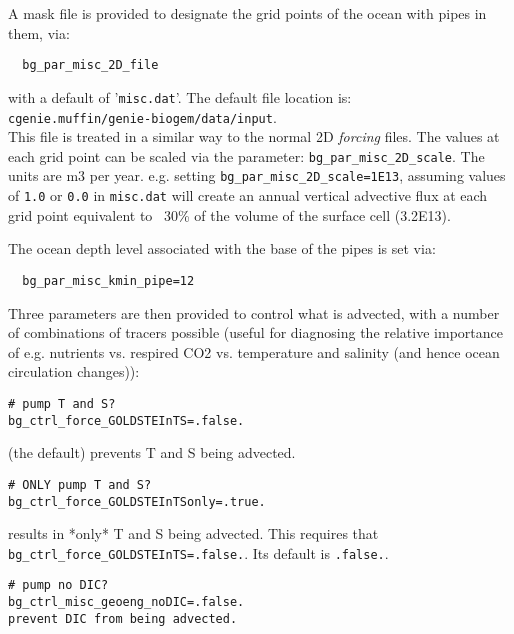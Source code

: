 \documentclass[10pt,twoside]{article}
\begin{document}
\begin{compactitem}

        \item A mask file is provided to designate the grid points of the ocean with pipes in them, via:
        \vspace{-5pt}\begin{verbatim}
  bg_par_misc_2D_file
        \end{verbatim}\vspace{-5pt}
        with a default of '\texttt{misc.dat}'. The default file location is:
        \\\texttt{cgenie.muffin/genie-biogem/data/input}.
        \\This file is treated in a similar way to the normal 2D \textit{forcing} files. The values at each grid point can be scaled via the parameter: \texttt{bg\_par\_misc\_2D\_scale}.
        The units are m3 per year. e.g. setting \texttt{bg\_par\_misc\_2D\_scale=1E13}, assuming values of \texttt{1.0} or \texttt{0.0} in \texttt{misc.dat} will create an annual vertical advective flux at each grid point equivalent to ~30\% of the volume of the surface cell (3.2E13).
        \item The ocean depth level associated with the base of the pipes is set via:
        \vspace{-5pt}\begin{verbatim}
  bg_par_misc_kmin_pipe=12
        \end{verbatim}\vspace{-5pt}
        \item Three parameters are then provided to control what is advected, with a number of combinations of tracers possible (useful for diagnosing the relative importance of e.g. nutrients vs. respired CO2 vs. temperature and salinity (and hence ocean circulation changes)):
        
          \begin{compactitem}
        \item 
        \vspace{-5pt}\begin{verbatim}
# pump T and S?
bg_ctrl_force_GOLDSTEInTS=.false.
        \end{verbatim}
 (the default) prevents T and S being advected.
        \item 
        \vspace{-5pt}\begin{verbatim}
# ONLY pump T and S?
bg_ctrl_force_GOLDSTEInTSonly=.true.
        \end{verbatim}
        results in *only* T and S being advected. This requires that \texttt{bg\_ctrl\_force\_GOLDSTEInTS=.false.}. Its default is \texttt{.false.}.
        \item 
        \vspace{-5pt}\begin{verbatim}
# pump no DIC?
bg_ctrl_misc_geoeng_noDIC=.false.
prevent DIC from being advected.
        \end{verbatim}


\end{compactitem}
\end{compactitem}
\end{document}
